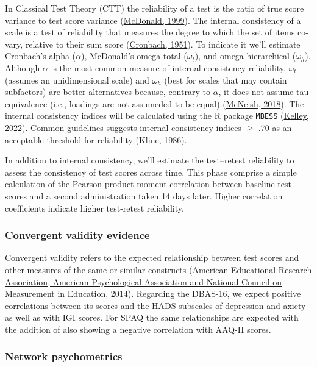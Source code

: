 \documentclass[
  ,doc,11pt, twoside,floatsintext]{apa6}
\begin{document}
In Classical Test Theory (CTT) the reliability of a test is the ratio of true score variance to test score variance (\protect\hyperlink{ref-mcdonald1999}{McDonald, 1999}). The internal consistency of a scale is a test of reliability that measures the degree to which the set of items co-vary, relative to their sum score (\protect\hyperlink{ref-cronbach1951}{Cronbach, 1951}). To indicate it we'll estimate Cronbach's alpha (\(\alpha\)), McDonald's omega total (\(\omega_t\)), and omega hierarchical (\(\omega_h\)). Although \(\alpha\) is the most common measure of internal consistency reliability, \(\omega_t\) (assumes an unidimensional scale) and \(\omega_h\) (best for scales that may contain subfactors) are better alternatives because, contrary to \(\alpha\), it does not assume tau equivalence (i.e., loadings are not assumeded to be equal) (\protect\hyperlink{ref-mcneish2018}{McNeish, 2018}). The internal consistency indices will be calculated using the R package \texttt{MBESS} (\protect\hyperlink{ref-MBESS}{Kelley, 2022}). Common guidelines suggests internal consistency indices \(\ge\) .70 as an acceptable threshold for reliability (\protect\hyperlink{ref-kline1986}{Kline, 1986}).

In addition to internal consistency, we'll estimate the test--retest reliability to assess the consistency of test scores across time. This phase comprise a simple calculation of the Pearson product-moment correlation between baseline test scores and a second administration taken 14 days later. Higher correlation coefficients indicate higher test-retest reliability.

\hypertarget{convergent-validity-evidence}{%
\subsubsection{Convergent validity evidence}\label{convergent-validity-evidence}}

Convergent validity refers to the expected relationship between test scores and other measures of the same or similar constructs (\protect\hyperlink{ref-standards2014}{American Educational Research Association, American Psychological Association and National Council on Measurement in Education, 2014}). Regarding the DBAS-16, we expect positive correlations between its scores and the HADS subscales of depression and axiety as well as with IGI scores. For SPAQ the same relationships are expected with the addition of also showing a negative correlation with AAQ-II scores.

\hypertarget{network-psychometrics}{%
\subsubsection{Network psychometrics}\label{network-psychometrics}}
\end{document}
